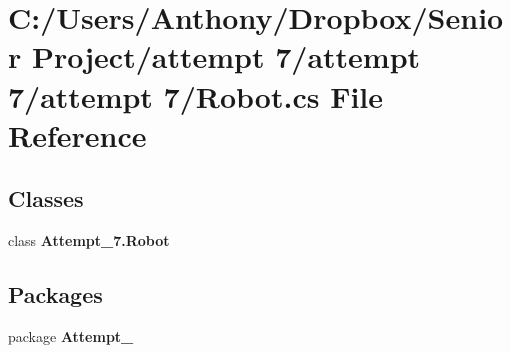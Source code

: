 \section{C:/Users/Anthony/Dropbox/Senior Project/attempt 7/attempt 7/attempt 7/Robot.cs File Reference}
\label{_robot_8cs}
\subsection*{Classes}
\begin{DoxyCompactItemize}
\item 
class {\bf Attempt\_\-7.Robot}
\end{DoxyCompactItemize}
\subsection*{Packages}
\begin{DoxyCompactItemize}
\item 
package {\bf Attempt\_}
\end{DoxyCompactItemize}
